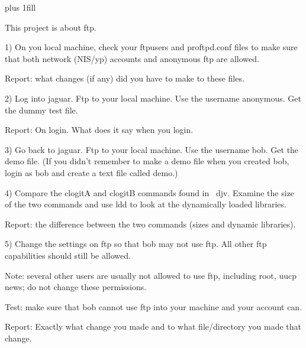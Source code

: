 
\rightskip=0pt plus 1fill

\parindent 0pt

This project is about ftp.

1) On you local machine, check your {\ltt{}ftpusers}
and {\ltt{}proftpd.conf} files to make sure that
both network (NIS/yp) accounts and anonymous ftp
are allowed.

Report: what changes (if any) did you have to make to these
files.

2) Log into jaguar.
Ftp to your local machine.
Use the username anonymous.
Get the dummy test file.

Report: On login. What does it say when you login.

3) Go back to jaguar.
Ftp to your local machine.
Use the username bob.
Get the {\ltt{}demo} file.
(If you didn't remember to make a demo file when you created
bob, login as bob and create a text file called demo.)

4) Compare the {\ltt{}clogitA} and {\ltt{}clogitB} commands found in
{\ltt{}~djv}.
Examine the size of the two commands
and use {\ltt{}ldd} to look at the dynamically loaded libraries.

Report: the difference between the two commands (sizes and dynamic libraries).

5) Change the settings on ftp so that {\ltt{}bob} may not use ftp.
All other ftp capabilities should still be allowed.

Note: several other users are usually not allowed to use ftp, including {\ltt{}root}, {\ltt{}uucp}
{\ltt{}news}; do not change these permissions.

Test: make sure that {\ltt{}bob} cannot use ftp into your machine and your
account can.

Report: Exactly what change you made and to what
file/directory you made that change.
\bye
